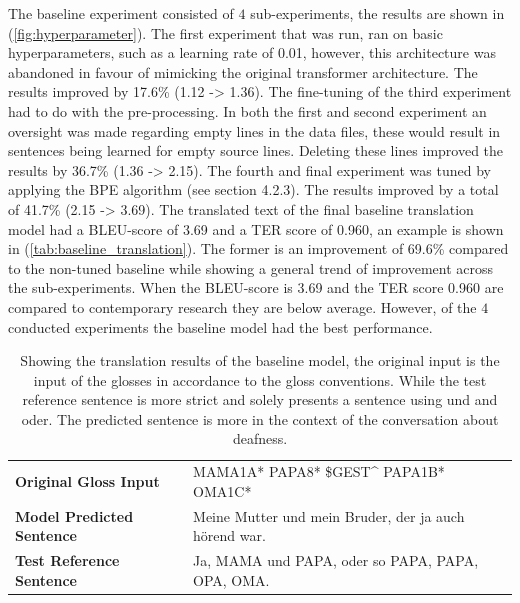 The baseline experiment consisted of $4$ sub-experiments, the results are shown in (\autoref{fig:hyperparameter}). The first experiment that was run, ran on basic hyperparameters, such as a learning rate of 0.01, however, this architecture was abandoned in favour of mimicking the original transformer architecture. The results improved by 17.6\% (1.12 -> 1.36). The fine-tuning of the third experiment had to do with the pre-processing. In both the first and second experiment an oversight was made regarding empty lines in the data files, these would result in sentences being learned for empty source lines. Deleting these lines improved the results by 36.7\% (1.36 -> 2.15). The fourth and final experiment was tuned by applying the BPE algorithm \cite{gage1994new} (see section 4.2.3). The results improved by a total of 41.7\% (2.15 -> 3.69). The translated text of the final baseline translation model had a BLEU-score of 3.69 and a TER score of 0.960, an example is shown in (\autoref{tab:baseline_translation}). The former is an improvement of 69.6\% compared to the non-tuned baseline while showing a general trend of improvement across the sub-experiments. When the BLEU-score is 3.69 and the TER score 0.960 are compared to contemporary research they are below average.  However, of the $4$ conducted experiments the baseline model had the best performance.

\begin{table}[h]
\centering
\caption{Showing the translation results of the baseline model, the original input is the input of the glosses in accordance to the gloss conventions. While the test reference sentence is more strict and solely presents a sentence using und and oder. The predicted sentence is more in the context of the conversation about deafness. }

\begin{tabular}{ll}
\textbf{Original Gloss Input}     & MAMA1A* PAPA8* \$GEST\textasciicircum{} PAPA1B* OMA1C* \\
\textbf{Model Predicted Sentence} & Meine Mutter und mein Bruder, der ja auch hörend war.                                                                                     \\
\textbf{Test Reference Sentence}  & Ja, MAMA und PAPA, oder so PAPA, PAPA, OPA, OMA.                                                                                         
\end{tabular}
\bottomrule
\label{tab:baseline_translation}
\end{table}


